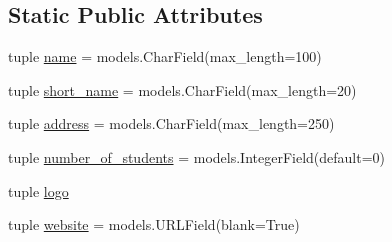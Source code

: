 \subsection*{Static Public Attributes}
\begin{DoxyCompactItemize}
\item 
tuple \hyperlink{classinstitutions_1_1models_1_1_institution_a47d5d3011f5f9943d955f6bc6a14bee1}{name} = models.\-Char\-Field(max\-\_\-length=100)
\item 
tuple \hyperlink{classinstitutions_1_1models_1_1_institution_a4bde4b882a3be7afc56f079ef5c3c2f7}{short\-\_\-name} = models.\-Char\-Field(max\-\_\-length=20)
\item 
tuple \hyperlink{classinstitutions_1_1models_1_1_institution_a77aaa6298e0d54927ffdf1c68842e268}{address} = models.\-Char\-Field(max\-\_\-length=250)
\item 
tuple \hyperlink{classinstitutions_1_1models_1_1_institution_abbd1e8085f23c97a4df5063d7c2d10db}{number\-\_\-of\-\_\-students} = models.\-Integer\-Field(default=0)
\item 
tuple \hyperlink{classinstitutions_1_1models_1_1_institution_a684486eaef9bc7435339ecfd40173408}{logo}
\item 
tuple \hyperlink{classinstitutions_1_1models_1_1_institution_a034171aa4e9e08fb0d9ea18cb225f1f7}{website} = models.\-U\-R\-L\-Field(blank=True)
\end{DoxyCompactItemize}


